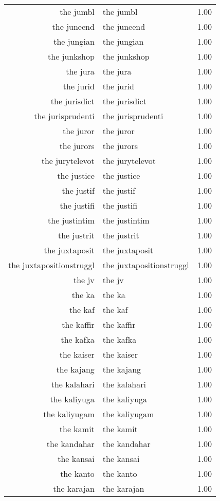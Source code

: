 \begin{table}[ht]
\begin{tabular}{rlr}
  the jumbl & the jumbl & 1.00 \\ 
  the juneend & the juneend & 1.00 \\ 
  the jungian & the jungian & 1.00 \\ 
  the junkshop & the junkshop & 1.00 \\ 
  the jura & the jura & 1.00 \\ 
  the jurid & the jurid & 1.00 \\ 
  the jurisdict & the jurisdict & 1.00 \\ 
  the jurisprudenti & the jurisprudenti & 1.00 \\ 
  the juror & the juror & 1.00 \\ 
  the jurors & the jurors & 1.00 \\ 
  the jurytelevot & the jurytelevot & 1.00 \\ 
  the justice & the justice & 1.00 \\ 
  the justif & the justif & 1.00 \\ 
  the justifi & the justifi & 1.00 \\ 
  the justintim & the justintim & 1.00 \\ 
  the justrit & the justrit & 1.00 \\ 
  the juxtaposit & the juxtaposit & 1.00 \\ 
  the juxtapositionstruggl & the juxtapositionstruggl & 1.00 \\ 
  the jv & the jv & 1.00 \\ 
  the ka & the ka & 1.00 \\ 
  the kaf & the kaf & 1.00 \\ 
  the kaffir & the kaffir & 1.00 \\ 
  the kafka & the kafka & 1.00 \\ 
  the kaiser & the kaiser & 1.00 \\ 
  the kajang & the kajang & 1.00 \\ 
  the kalahari & the kalahari & 1.00 \\ 
  the kaliyuga & the kaliyuga & 1.00 \\ 
  the kaliyugam & the kaliyugam & 1.00 \\ 
  the kamit & the kamit & 1.00 \\ 
  the kandahar & the kandahar & 1.00 \\ 
  the kansai & the kansai & 1.00 \\ 
  the kanto & the kanto & 1.00 \\ 
  the karajan & the karajan & 1.00 \\ 

\end{tabular}
\end{table}
